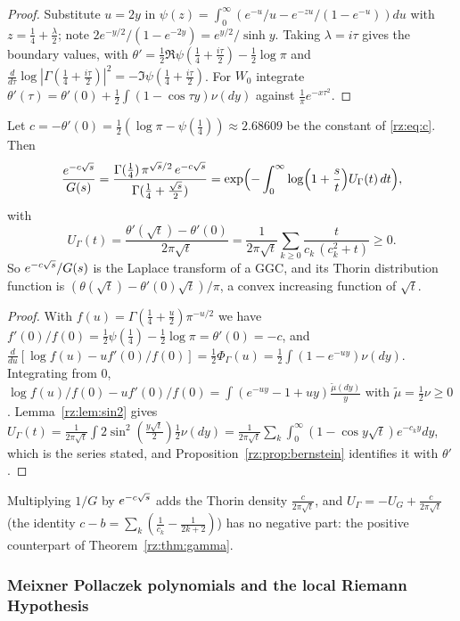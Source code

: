 \begin{proof}
Substitute $u=2y$ in $\psi(z)=\int_0^\infty(e^{-u}/u-e^{-zu}/(1-e^{-u}))du$ with $z=\frac14+\frac\lambda2$; note $2e^{-y/2}/(1-e^{-2y})=e^{y/2}/\sinh y$. Taking $\lambda=i\tau$ gives the boundary values, with $\theta'=\frac12\Re\psi(\frac14+\frac{i\tau}2)-\frac12\log\pi$ and $\frac{d}{d\tau}\log|\Gamma(\frac14+\frac{i\tau}2)|^2=-\Im\psi(\frac14+\frac{i\tau}2)$. For $W_0$ integrate $\theta'(\tau)=\theta'(0)+\frac12\int(1-\cos\tau y)\nu(dy)$ against $\frac1\pi e^{-x\tau^2}$.
\end{proof}

\begin{theorem}\label{rz:thm:gammaggc}
Let $c=-\theta'(0)=\frac12(\log\pi-\psi(\frac14))\approx2.68609$ be the constant of \eqref{rz:eq:c}. Then
\[
\frac{e^{-c\sqrt{s}}}{G(s)}=\frac{\Gamma(\frac14)\,\pi^{\sqrt{s}/2}\,e^{-c\sqrt{s}}}{\Gamma(\frac14+\frac{\sqrt{s}}2)}=\exp\Bigl(-\int_0^\infty\log\Bigl(1+\frac st\Bigr)U_\Gamma(t)\,dt\Bigr),
\]
with
\[
U_\Gamma(t)=\frac{\theta'(\sqrt t)-\theta'(0)}{2\pi\sqrt t}=\frac{1}{2\pi\sqrt t}\sum_{k\ge0}\frac{t}{c_k\,(c_k^2+t)}\ge0 .
\]
So $e^{-c\sqrt{s}}/G(s)$ is the Laplace transform of a GGC, and its Thorin distribution function is $(\theta(\sqrt t)-\theta'(0)\sqrt t)/\pi$, a convex increasing function of $\sqrt t$.
\end{theorem}

\begin{proof}
With $f(u)=\Gamma(\frac14+\frac u2)\pi^{-u/2}$ we have $f'(0)/f(0)=\frac12\psi(\frac14)-\frac12\log\pi=\theta'(0)=-c$, and $\frac{d}{du}[\log f(u)-uf'(0)/f(0)]=\frac12\Phi_\Gamma(u)=\frac12\int(1-e^{-uy})\nu(dy)$. Integrating from $0$, $\log f(u)/f(0)-uf'(0)/f(0)=\int(e^{-uy}-1+uy)\frac{\tilde\mu(dy)}{y}$ with $\tilde\mu=\frac12\nu\ge0$. Lemma~\ref{rz:lem:sin2} gives $U_\Gamma(t)=\frac{1}{2\pi\sqrt t}\int2\sin^2(\frac{y\sqrt t}2)\frac12\nu(dy)=\frac{1}{2\pi\sqrt t}\sum_k\int_0^\infty(1-\cos y\sqrt t)e^{-c_ky}dy$, which is the series stated, and Proposition~\ref{rz:prop:bernstein} identifies it with $\theta'$.
\end{proof}

Multiplying $1/G$ by $e^{-c\sqrt{s}}$ adds the Thorin density $\frac{c}{2\pi\sqrt t}$, and $U_\Gamma=-U_G+\frac{c}{2\pi\sqrt t}$ (the identity $c-b=\sum_k(\frac1{c_k}-\frac1{2k+2})$) has no negative part: the positive counterpart of Theorem~\ref{rz:thm:gamma}.

\subsubsection{Meixner Pollaczek polynomials and the local Riemann Hypothesis}

